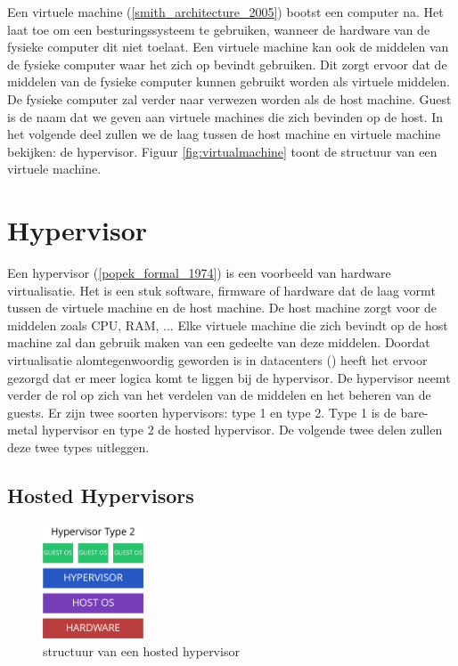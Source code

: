\documentclass[pdftex,a4paper,12pt,twoside]{report}
\begin{document}
Een virtuele machine (\ref{smith_architecture_2005}) bootst een computer na. Het laat toe om een besturingssysteem te gebruiken, wanneer de hardware van de fysieke computer dit niet toelaat. Een virtuele machine kan ook de middelen van de fysieke computer waar het zich op bevindt gebruiken. Dit zorgt ervoor dat de middelen van de fysieke computer kunnen gebruikt worden als virtuele middelen. De fysieke computer zal verder naar verwezen worden als de host machine. Guest is de naam dat we geven aan virtuele machines die zich bevinden op de host. In het volgende deel zullen we de laag tussen de host machine en virtuele machine bekijken: de hypervisor. Figuur \ref{fig:virtualmachine} toont de structuur van een virtuele machine. 

\section{Hypervisor}

Een hypervisor (\ref{popek_formal_1974}) is een voorbeeld van hardware virtualisatie. Het is een stuk software, firmware of hardware dat de laag vormt tussen de virtuele machine en de host machine. De host machine zorgt voor de middelen zoals CPU, RAM, ... Elke virtuele machine die zich bevindt op de host machine zal dan gebruik maken van een gedeelte van deze middelen. Doordat virtualisatie alomtegenwoordig geworden is in datacenters (\cite{soundararajan_impact_2010}) heeft het ervoor gezorgd dat er meer logica komt te liggen bij de hypervisor. De hypervisor neemt verder de rol op zich van het verdelen van de middelen en het beheren van de guests. Er zijn twee soorten hypervisors: type 1 en type 2. Type 1 is de bare-metal hypervisor en type 2 de hosted hypervisor. De volgende twee delen zullen deze twee types uitleggen.

\newpage

\subsection{Hosted Hypervisors}

\begin{figure}
    \centering
    \includegraphics[width=3cm]{img/hypervisor-2}
    \caption{structuur van een hosted hypervisor}
    \label{fig:hypervisor-2}
\end{figure}
\end{document}
